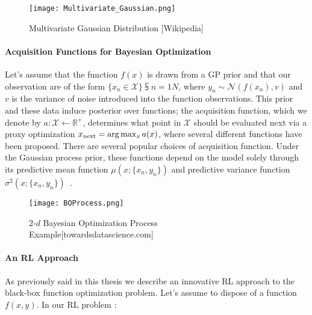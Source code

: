 \begin{figure} [h!]
	\centering
	\texttt{[image: Multivariate\_Gaussian.png]}
	\caption{Multivariate Gaussian Distribution [Wikipedia]}
	\label{fig:Multivatiate_Gaussian}
\end{figure}

\paragraph{Acquisition Functions for Bayesian Optimization} Let's assume that the function $f(x)$ is drawn from a GP prior and that our observation are of the form $\{x_n \in \mathcal{X}\}\subsup{}{ n=1}{N}$, where $y_n \sim \mathcal{N}(f(x_n), v)$ and $v$ is the variance of noise introduced into the function observations. This prior and these data induce  posterior over functions; the acquisition function, which we denote by $a : \mathcal{X} \leftarrow \mathbb{R}^+$, determines what point in $\mathcal{X}$ should be evaluated next via a proxy optimization $x\textsubscript{next} = \arg\max_{x}a(x)$, where several different functions have been proposed. There are several popular choices of acquisition function. Under the Gaussian process prior, these functions depend on the model solely through its predictive mean function $\mu(x; \{x_n, y_n\})$ and predictive variance function $\sigma^2(x; \{x_n, y_n\})$~\cite{NIPS2012_4522}.

\begin{figure} [h!]
	\centering
	\texttt{[image: BOProcess.png]}
	\caption{2-$d$ Bayesian Optimization Process Example[towardsdatascience.com]}
	\label{fig:BoProcess}
\end{figure}

\paragraph{An RL Approach} As previously said in this thesis we describe an innovative RL approach to the black-box function optimization problem. Let's assume to dispose of a function $f(x, y)$. In our RL problem :


